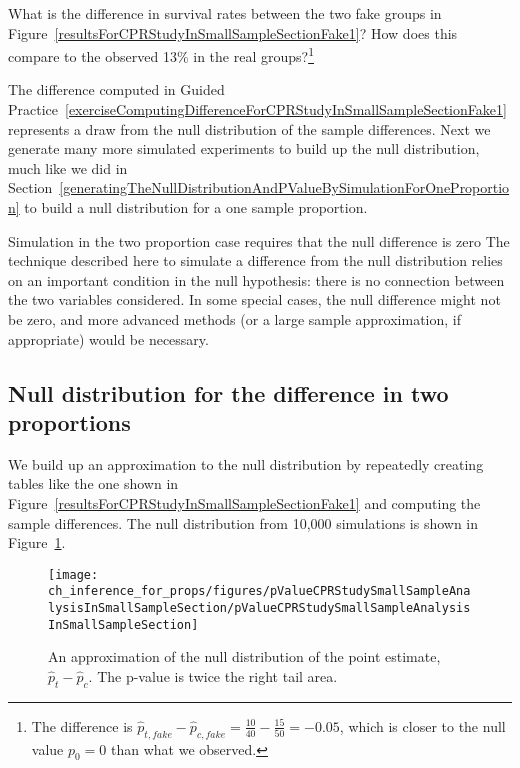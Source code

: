 \begin{exercise} \label{exerciseComputingDifferenceForCPRStudyInSmallSampleSectionFake1}
What is the difference in survival rates between the two fake groups in Figure~\ref{resultsForCPRStudyInSmallSampleSectionFake1}? How does this compare to the observed 13\% in the real groups?\footnote{The difference is $\hat{p}_{t, fake} - \hat{p}_{c, fake} = \frac{10}{40} - \frac{15}{50} = -0.05$, which is closer to the null value $p_0=0$ than what we observed.}
\end{exercise}

The difference computed in Guided Practice~\ref{exerciseComputingDifferenceForCPRStudyInSmallSampleSectionFake1} represents a draw from the null distribution of the sample differences. Next we generate many more simulated experiments to build up the null distribution, much like we did in Section~\ref{generatingTheNullDistributionAndPValueBySimulationForOneProportion} to build a null distribution for a one sample proportion.

\begin{caution}{Simulation in the two proportion case requires that the null difference is zero}
{The technique described here to simulate a difference from the null distribution relies on an important condition in the null hypothesis: there is no connection between the two variables considered. In some special cases, the null difference might not be zero, and more advanced methods (or a large sample approximation, if appropriate) would be necessary.}
\end{caution}

\subsection{Null distribution for the difference in two proportions}

We build up an approximation to the null distribution by repeatedly creating tables like the one shown in Figure~\ref{resultsForCPRStudyInSmallSampleSectionFake1} and computing the sample differences. The null distribution from 10,000 simulations is shown in Figure~\ref{pValueCPRStudySmallSampleAnalysisInSmallSampleSection}.
\begin{figure}
\centering
\texttt{[image: ch\_inference\_for\_props/figures/pValueCPRStudySmallSampleAnalysisInSmallSampleSection/pValueCPRStudySmallSampleAnalysisInSmallSampleSection]}
\caption{An approximation of the null distribution of the point estimate, $\hat{p}_t - \hat{p}_c$. The p-value is twice the right tail area.}
\label{pValueCPRStudySmallSampleAnalysisInSmallSampleSection}
\end{figure}

